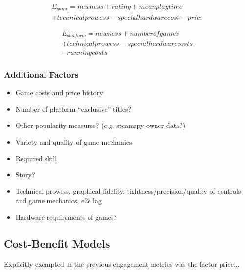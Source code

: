 
\begin{equation}
\begin{split}
E_{game} = {newness} + {rating} +  {meanplaytime} \\+ {technicalprowess} - {specialhardwarecost} - {price}
\end{split}
\end{equation}

\begin{equation}
\begin{split}
E_{platform} = {newness} + {numberofgames} \\+ {technicalprowess} - {specialhardwarecosts}\\ - {runningcosts}
\end{split}
\end{equation}

\subsubsection{Additional Factors}

\begin{itemize}
	\item Game costs and price history
	\item Number of platform ``exclusive'' titles?
	\item Other popularity measures? (e.g. steamspy owner data?)
	\item Variety and quality of game mechanics
	\item Required skill
	\item Story?
	\item Technical prowess, graphical fidelity, tightness/precision/quality of controls and game mechanics, e2e lag
	\item Hardware requirements of games?
\end{itemize}


\subsection{Cost-Benefit Models}

Explicitly exempted in the previous engagement metrics was the factor price...




